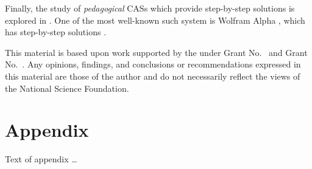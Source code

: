 \documentclass[acmsmall,review,anonymous]{acmart}\settopmatter{printfolios=true,printccs=false,printacmref=false}
\begin{document}
Finally, the study of \emph{pedagogical} CASs which provide step-by-step
solutions is explored in \citet{lioubartsev_constructing_2016}. One of the most
well-known such system is Wolfram Alpha
\cite{wolfram_research_inc._wolframalpha_2019}, which has step-by-step solutions
\cite{the_development_team_step-by-step_2009}.

\begin{acks}                            %
  This material is based upon work supported by the
   under Grant
  No.~ and Grant
  No.~.  Any opinions, findings, and
  conclusions or recommendations expressed in this material are those
  of the author and do not necessarily reflect the views of the
  National Science Foundation.
\end{acks}



\appendix
\section{Appendix}

Text of appendix \ldots
\end{document}
